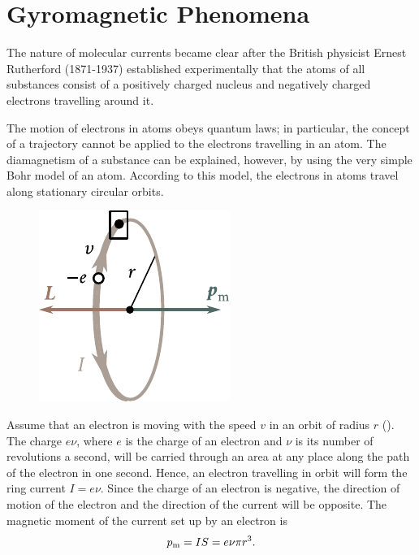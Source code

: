\section{Gyromagnetic Phenomena}\label{sec:7_6}

The nature of molecular currents became clear after the British physicist Ernest Rutherford (1871-1937) established experimentally that the atoms of all substances consist of a positively charged nucleus and negatively charged electrons travelling around it.

The motion of electrons in atoms obeys quantum laws; in particular, the concept of a trajectory cannot be applied to the electrons travelling in an atom.
The diamagnetism of a substance can be explained, however, by using the very simple Bohr model of an atom.
According to this model, the electrons in atoms travel along stationary circular orbits.

\begin{figure}[t]
	\begin{center}
		\includegraphics[scale=1]{figures/ch_07/fig_7_10.pdf}
		\caption[]{}
		\label{fig:7_10}
	\end{center}
	\vspace{-0.8cm}
\end{figure}

Assume that an electron is moving with the speed $v$ in an orbit of radius $r$ ().
The charge $e\nu$, where $e$ is the charge of an electron and $\nu$ is its number of revolutions a second, will be carried through an area at any place along the path of the electron in one second.
Hence, an electron travelling in orbit will form the ring current $I=e\nu$.
Since the charge of an electron is negative, the direction of motion of the electron and the direction of the current will be opposite.
The magnetic moment of the current set up by an electron is
\begin{equation*}
    p_{\text{m}} = IS = e\nu\pi r^3.
\end{equation*}

